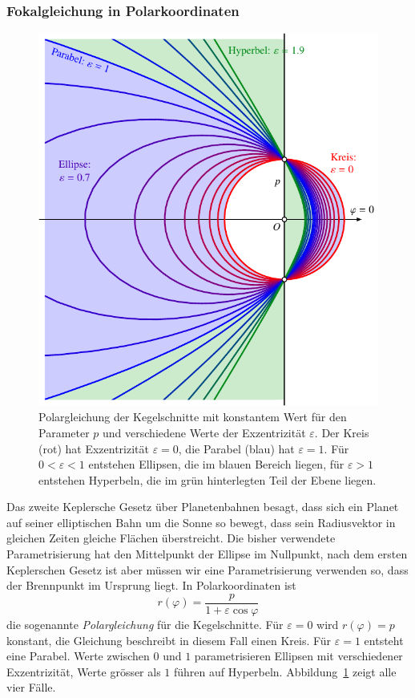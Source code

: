 \subsubsection{Fokalgleichung in Polarkoordinaten}
\begin{figure}
\centering
\includegraphics{chapters/030-geometrie/images/polargleichung.pdf}
\caption{Polargleichung der Kegelschnitte mit konstantem Wert für den
Parameter $p$ und verschiedene Werte der Exzentrizität $\varepsilon$.
Der Kreis (rot) hat Exzentrizität $\varepsilon=0$,
die Parabel (blau) hat $\varepsilon=1$.
Für $0<\varepsilon<1$ entstehen Ellipsen, die im blauen Bereich liegen,
für $\varepsilon>1$ entstehen Hyperbeln, die im grün hinterlegten Teil
der Ebene liegen.
\label{buch:geometrie:fig:polargleichung}}
\end{figure}
Das zweite Keplersche Gesetz über Planetenbahnen besagt, dass sich ein
Planet auf seiner elliptischen Bahn um die Sonne so bewegt, dass
sein Radiusvektor in gleichen Zeiten gleiche Flächen überstreicht.
Die bisher verwendete Parametrisierung hat den Mittelpunkt der Ellipse
im Nullpunkt, nach dem ersten Keplerschen Gesetz ist aber müssen
wir eine Parametrisierung verwenden so, dass der Brennpunkt im
Ursprung liegt.
In Polarkoordinaten ist
\begin{equation}
r(\varphi) = \frac{p}{1+\varepsilon \cos\varphi}
\label{buch:geometrie:eqn:polargleichung}
\end{equation}
die sogenannte {\em Polargleichung} für die Kegelschnitte.
Für $\varepsilon=0$ wird $r(\varphi)=p$ konstant, die Gleichung
beschreibt in diesem Fall einen Kreis.
Für $\varepsilon=1$ entsteht eine Parabel.
Werte zwischen $0$ und $1$ parametrisieren Ellipsen mit verschiedener
Exzentrizität, Werte grösser als $1$ führen auf Hyperbeln.
Abbildung~\ref{buch:geometrie:fig:polargleichung} zeigt alle vier Fälle.

